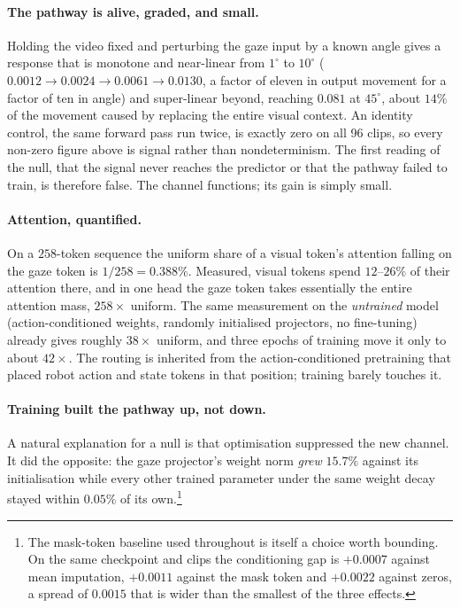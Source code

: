\paragraph{The pathway is alive, graded, and small.}
Holding the video fixed and perturbing the gaze input by a known angle gives a
response that is monotone and near-linear from $1^\circ$ to $10^\circ$
($0.0012 \rightarrow 0.0024 \rightarrow 0.0061 \rightarrow 0.0130$, a factor of
eleven in output movement for a factor of ten in angle) and super-linear beyond,
reaching $0.081$ at $45^\circ$, about $14\%$ of the movement caused by
replacing the entire visual context. An identity control, the same forward pass
run twice, is exactly zero on all \num{96} clips, so every non-zero figure above
is signal rather than nondeterminism. The first reading of the null, that the
signal never reaches the predictor or that the pathway failed to train, is
therefore false. The channel functions; its gain is simply small.

\paragraph{Attention, quantified.}
On a $258$-token sequence the uniform share of a visual token's attention falling
on the gaze token is $1/258 = 0.388\%$. Measured, visual tokens spend
$12$--$26\%$ of their attention there, and in one head the gaze token takes
essentially the entire attention mass, $258\times$ uniform. The same
measurement on the \emph{untrained} model (action-conditioned weights, randomly
initialised projectors, no fine-tuning) already gives roughly $38\times$
uniform, and three epochs of training move it only to about $42\times$. The
routing is inherited from the action-conditioned pretraining that placed robot
action and state tokens in that position; training barely touches it.

\paragraph{Training built the pathway up, not down.}
A natural explanation for a null is that optimisation suppressed the new channel.
It did the opposite: the gaze projector's weight norm \emph{grew} $15.7\%$ against
its initialisation while every other trained parameter under the same weight decay
stayed within $0.05\%$ of its own.\footnote{The mask-token baseline used
throughout is itself a choice worth bounding. On the same checkpoint and clips the
conditioning gap is $+0.0007$ against mean imputation, $+0.0011$ against the mask
token and $+0.0022$ against zeros, a spread of $0.0015$ that is wider than the
smallest of the three effects.}

